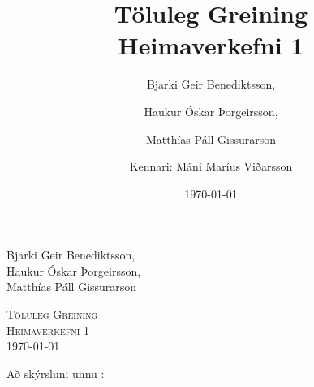 \documentclass[a4]{article}
\title{Töluleg Greining\\ Heimaverkefni 1}
\date{\today{}}
\author{ 
  Bjarki Geir Benediktsson,\and
  Haukur Óskar Þorgeirsson,\and
  Matthías Páll Gissurarson \and
  Kennari: Máni Maríus Viðarsson
  }
\begin{document}
\begin{flushright}
  Bjarki Geir Benediktsson,\\
  Haukur Óskar Þorgeirsson,\\
  Matthías Páll Gissurarson\\
\end{flushright}

\begin{center}
 \textsc{ \LARGE Töluleg Greining\\
  Heimaverkefni 1\\
  \today{}
  }
  \end{center}
\vfill

\maketitle


\vspace{20 mm}
Að skýrsluni unnu :
\hspace{0.5cm} \makebox[1.5in]{\hrulefill}
\hspace{0.5cm} \makebox[1.5in]{\hrulefill}
\hspace{0.5cm} \makebox[1.5in]{\hrulefill}
\end{document}
